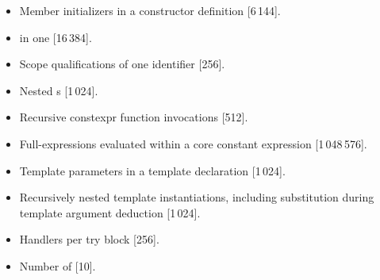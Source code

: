 \begin{itemize}
\item%
Member initializers in a constructor definition [6\,144].
\item%
 in one  [16\,384].
\item%
Scope qualifications of one identifier [256].
\item%
Nested s [1\,024].
\item%
Recursive constexpr function invocations [512].
\item%
Full-expressions evaluated within a core constant expression [1\,048\,576].
\item%
Template parameters in a template declaration [1\,024].
\item%
Recursively nested template instantiations, including substitution
during template argument deduction [1\,024].
\item%
Handlers per try block [256].
\item%
Number of  [10].

\end{itemize}
